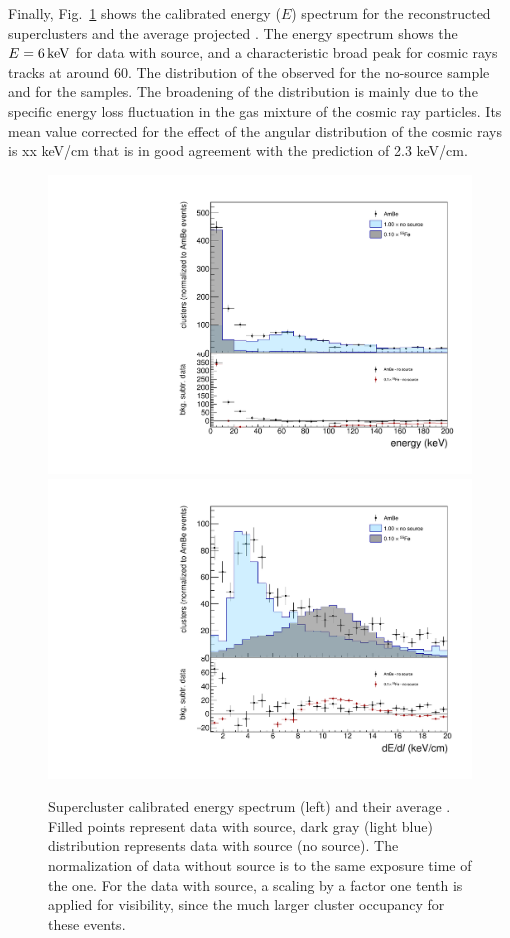 Finally, Fig.~\ref{fig:energy} shows the calibrated energy ($E$)
spectrum for the reconstructed superclusters and the average projected
\dedl. The energy spectrum shows the $E=6\,\textrm{ke\hspace{-.08em}V}$ for data
with \fe source, and a characteristic broad peak for cosmic rays
tracks at around 60\keV. The distribution of the observed
\dedl for the no-source sample and for the \ambe
samples. The broadening of the distribution is mainly due to the
specific energy loss fluctuation in the gas mixture of the cosmic ray
particles.  Its mean value corrected for the effect of the angular
distribution of the cosmic rays is xx keV/cm that is in good agreement
with the \garfield prediction of 2.3 keV/cm.

\begin{figure}[ht]
  \begin{center}
  \includegraphics[width=0.45\linewidth]{figures/energyExt}
  \includegraphics[width=0.45\linewidth]{figures/dedx}

  \caption{Supercluster calibrated energy spectrum (left) and their
    average \dedl.  Filled points represent data with \ambe source,
    dark gray (light blue) distribution represents data with \fe
    source (no source).  The normalization of data without source is
    to the same exposure time of the \ambe one. For the data with \fe
    source, a scaling by a factor one tenth is applied for visibility,
    since the much larger cluster occupancy for these
    events.  \label{fig:energy}}

\end{center}
\end{figure}

